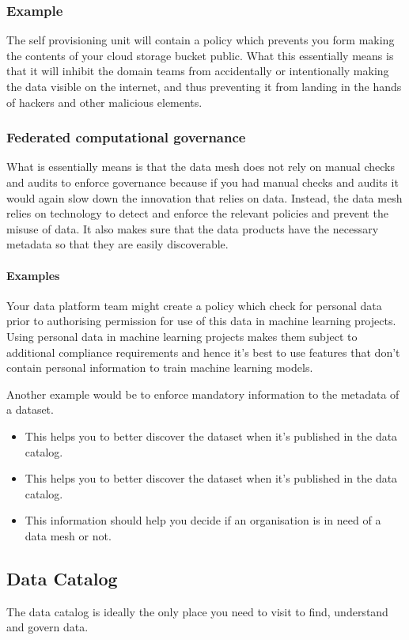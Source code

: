 \subsubsection{Example}
The self provisioning unit will contain a policy which prevents you form making the contents of your cloud storage bucket public.
What this essentially means is that it will inhibit the domain teams from accidentally or intentionally making the data visible on the internet, and thus preventing it from landing in the hands of hackers and other malicious elements.

\subsubsection{Federated computational governance}
What is essentially means is that the data mesh does not rely on manual checks and audits to enforce governance because if you had manual checks and audits it would again slow down the innovation that relies on data.
Instead, the data mesh relies on technology to detect and enforce the relevant policies and prevent the misuse of data.
It also makes sure that the data products have the necessary metadata so that they are easily discoverable.

\paragraph{Examples}
Your data platform team might create a policy which check for personal data prior to authorising permission for use of this data in machine learning projects.
Using personal data in machine learning projects makes them subject to additional compliance requirements and hence it's best to use features that don't contain personal information to train machine learning models.

Another example would be to enforce mandatory information to the metadata of a dataset.
\begin{itemize}
    \item This helps you to better discover the dataset when it's published in the data catalog.
    \item This helps you to better discover the dataset when it's published in the data catalog.
    \item This information should help you decide if an organisation is in need of a data mesh or not.
\end{itemize}

\subsection{Data Catalog}
The data catalog is ideally the only place you need to visit to find, understand and govern data.

